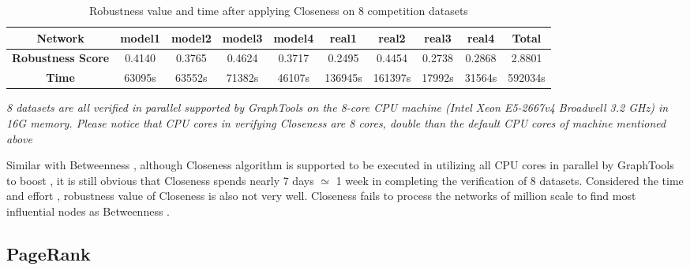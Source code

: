 \documentclass{article}
\begin{document}
	\begin{table}[!htbp]
		\begin{adjustwidth}{-1.3cm}{}		
			\begin{threeparttable}
				\centering
				\caption{Robustness value and time after applying Closeness on 8 competition datasets}
				\label{tab:table3}
				
				\begin{tabular}{|c|c|c|c|c|c|c|c|c|c|}
					\hline
					\textbf{Network}          & \textbf{model1} & \textbf{model2} & \textbf{model3} & \textbf{model4} & \textbf{real1} & \textbf{real2} & \textbf{real3} & \textbf{real4} & \textbf{Total} \\ \hline
					\textbf{Robustness Score} & 0.4140          & 0.3765          & 0.4624          & 0.3717          & 0.2495         & 0.4454         & 0.2738         & 0.2868         & 2.8801         \\ \hline
					\textbf{Time}     & 63095s           & 63552s           & 71382s           & 46107s           & 136945s         & 161397s         & 17992s          & 31564s          & 592034s         \\ \hline								
				\end{tabular}
				\begin{tablenotes}
					\small
					\item\textit{8 datasets are all verified in parallel supported by GraphTools \cite{peixotographtool2014} on the 8-core CPU machine (Intel Xeon E5-2667v4 Broadwell 3.2 GHz) in 16G memory. Please notice that CPU cores in verifying Closeness are 8 cores, double than the default CPU cores of machine mentioned above}
				\end{tablenotes}			
			\end{threeparttable}
		\end{adjustwidth}
	\end{table}
	
	Similar with Betweenness , although Closeness algorithm is supported to be executed in utilizing all CPU cores in parallel by GraphTools to boost , it is still obvious that Closeness spends nearly 7 days $\simeq$ 1 week in completing the verification of 8 datasets. Considered the time and effort , robustness value of Closeness is also not very well. Closeness fails to process the networks of million scale to find most influential nodes as Betweenness .
	
	
	\subsection{PageRank}	
	
\end{document}
